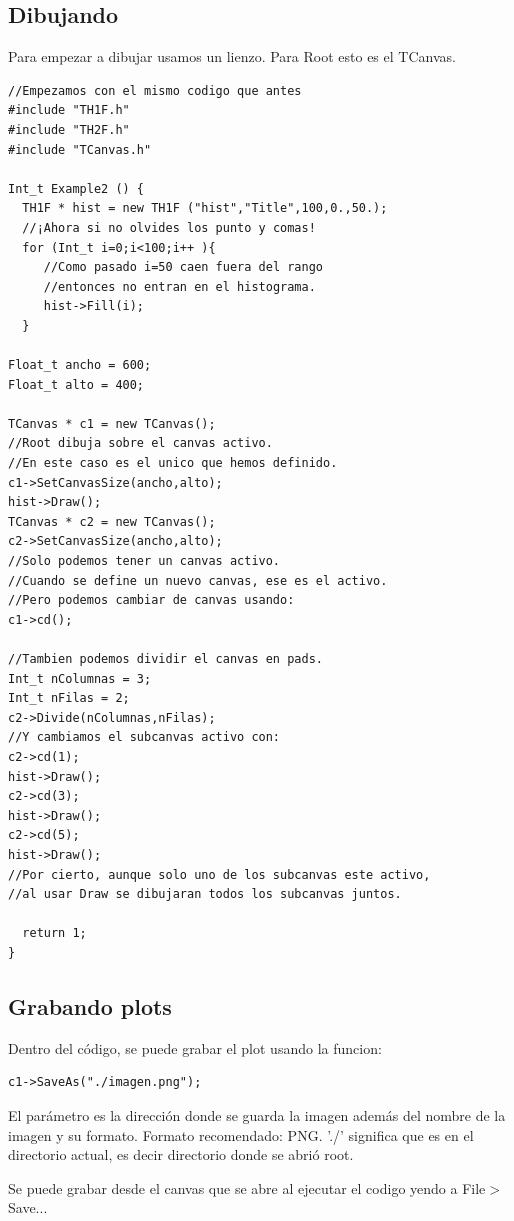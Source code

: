 \documentclass{article}
\begin{document}
\subsection{Dibujando}

Para empezar a dibujar usamos un lienzo. Para Root esto es el TCanvas.
\begin{tcolorbox} [breakable]
\begin{verbatim}
//Empezamos con el mismo codigo que antes
#include "TH1F.h"
#include "TH2F.h"
#include "TCanvas.h"

Int_t Example2 () {
  TH1F * hist = new TH1F ("hist","Title",100,0.,50.);
  //¡Ahora si no olvides los punto y comas!
  for (Int_t i=0;i<100;i++ ){
     //Como pasado i=50 caen fuera del rango
     //entonces no entran en el histograma.
     hist->Fill(i);
  }
  
Float_t ancho = 600;
Float_t alto = 400;

TCanvas * c1 = new TCanvas();
//Root dibuja sobre el canvas activo.
//En este caso es el unico que hemos definido.
c1->SetCanvasSize(ancho,alto);
hist->Draw();
TCanvas * c2 = new TCanvas();
c2->SetCanvasSize(ancho,alto);
//Solo podemos tener un canvas activo.
//Cuando se define un nuevo canvas, ese es el activo.
//Pero podemos cambiar de canvas usando:
c1->cd();

//Tambien podemos dividir el canvas en pads.
Int_t nColumnas = 3;
Int_t nFilas = 2;
c2->Divide(nColumnas,nFilas);
//Y cambiamos el subcanvas activo con:
c2->cd(1);
hist->Draw();
c2->cd(3);
hist->Draw();
c2->cd(5);
hist->Draw();
//Por cierto, aunque solo uno de los subcanvas este activo, 
//al usar Draw se dibujaran todos los subcanvas juntos.

  return 1;
}
\end{verbatim}
\end{tcolorbox}

\subsection{Grabando plots}

Dentro del c\'odigo, se puede grabar el plot usando la funcion: \newline
\begin{tcolorbox} [breakable]
\begin{verbatim}
c1->SaveAs("./imagen.png");
\end{verbatim}
\end{tcolorbox}
El par\'ametro es la direcci\'on donde se guarda la imagen adem\'as del nombre de la imagen y su formato. Formato recomendado: PNG. './' significa que es en el directorio actual, es decir directorio donde se abri\'o root. \par
Se puede grabar desde el canvas que se abre al ejecutar el codigo yendo a File$>$Save...
\end{document}
